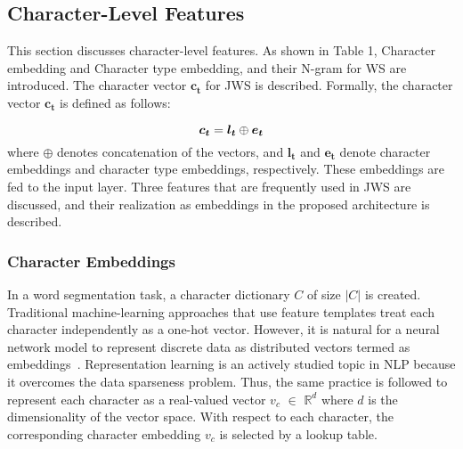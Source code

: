 \documentclass[11pt,letterpaper]{article}
\begin{document}


\subsection{Character-Level Features}
This section discusses character-level features. As shown in Table 1, Character embedding and Character type embedding, and their N-gram for WS are introduced. The character vector $\bm{c_{t}}$ for JWS is described. Formally, the character vector $\bm{c_{t}}$ is defined as follows:

\begin{equation}
\bm{c_{t}} = \bm{l_{t}} \oplus \bm{e_{t}}
\vspace{6pt}
\end{equation}
where $\oplus$ denotes concatenation of the vectors, and $\bm{l_{t}} $ and $ \bm{e_{t}}$ denote  character embeddings and character type embeddings, respectively. These embeddings are fed to the input layer. Three features that are frequently used in JWS are discussed, and their realization as embeddings in the proposed architecture is described.

\subsubsection{Character Embeddings}


In a word segmentation task, a character dictionary $C$ of size $|C|$ is created. 
Traditional machine-learning approaches that use feature templates treat each character independently as a one-hot vector.
However, it is natural for a neural network model to represent discrete data as distributed vectors termed as embeddings~\cite{Bengio:2003:NPL:944919.944966,collobert:2008}. Representation learning is an actively studied topic in NLP because it overcomes the data sparseness problem. Thus, the same practice is followed to represent each character as a real-valued vector $v_{c}$ $\in$ $\mathbb{R}^{d}$ where $d$ is the dimensionality of the vector space. 
With respect to each character, the corresponding character embedding $v_{c}$ is selected by a lookup table. 
\end{document}
